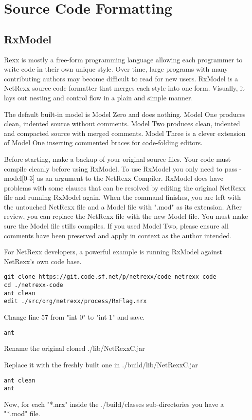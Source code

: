 \chapter{Source Code Formatting}

\section{RxModel}

Rexx is mostly a free-form programming language allowing each programmer to write code in their own unique style. Over time, large programs with many contributing authors may become difficult to read for new users. RxModel is a NetRexx source code formatter that merges each style into one form. Visually, it lays out nesting and control flow in a plain and simple manner.

The default built-in model is Model Zero and does nothing. Model One produces clean, indented source without comments. Model Two produces clean, indented and compacted source with merged comments. Model Three is a clever extension of Model One inserting commented braces for code-folding editors.

Before starting, make a backup of your original source files. Your code must compile cleanly before using RxModel. To use RxModel you only need to pass -model[0-3] as an argument to the NetRexx Compiler. RxModel does have problems with some clauses that can be resolved by editing the original NetRexx file and running RxModel again. When the command finishes, you are left with the untouched NetRexx file and a Model file with ".mod" as its extension. After review, you can replace the NetRexx file with the new Model file. You must make sure the Model file stills compiles. If you used Model Two, please ensure all comments have been preserved and apply in context as the author intended.     


For NetRexx developers, a powerful example is running RxModel against NetRexx's own code base.
\begin{lstlisting} 
git clone https://git.code.sf.net/p/netrexx/code netrexx-code
cd ./netrexx-code
ant clean
edit ./src/org/netrexx/process/RxFlag.nrx
\end{lstlisting}
Change line 57 from "int     0" to "int     1" and save.  
\begin{lstlisting} 
ant
\end{lstlisting}
Rename the original cloned ./lib/NetRexxC.jar

Replace it with the freshly built one in ./build/lib/NetRexxC.jar
\begin{lstlisting} 
ant clean
ant
\end{lstlisting}
Now, for each "*.nrx" inside the ./build/classes sub-directories you have a "*.mod" file.

